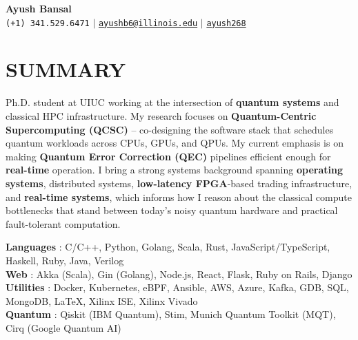 \documentclass[letterpaper,11pt]{article}
\begin{document}
\begin{center}
    \textbf{\Large Ayush Bansal} \\ \vspace{5pt}
    \small \faPhone* \hspace{2pt} \texttt{(+1) 341.529.6471} \hspace{1pt} $|$
    \hspace{1pt} \faEnvelope \hspace{2pt} \href{mailto:ayushb6@illinois.edu}{\texttt{ayushb6@illinois.edu}} \hspace{1pt} $|$
    \hspace{1pt} \faLinkedin \hspace{2pt} \href{https://linkedin.com/in/ayush268}{\texttt{ayush268}}
    \\ \vspace{-3pt}
\end{center}

\section{SUMMARY}
  \vspace{4pt}
  \small{Ph.D. student at UIUC working at the intersection of \textbf{quantum systems} and classical HPC infrastructure.
  My research focuses on \textbf{Quantum-Centric Supercomputing (QCSC)} -- co-designing the software stack that schedules
  quantum workloads across CPUs, GPUs, and QPUs. My current emphasis is on making \textbf{Quantum Error Correction (QEC)}
  pipelines efficient enough for \textbf{real-time} operation. I bring a strong systems background spanning
  \textbf{operating systems}, distributed systems, \textbf{low-latency FPGA}-based trading infrastructure, and
  \textbf{real-time systems}, which informs how I reason about the classical compute bottlenecks that stand between today's
  noisy quantum hardware and practical fault-tolerant computation.}
  \vspace{4pt}
  \begin{itemize}[leftmargin=0in, label={}]
    \small{\item{
     \textbf{Languages} {: C/C++, Python, Golang, Scala, Rust, JavaScript/TypeScript, Haskell, Ruby, Java, Verilog}\vspace{2pt} \\
     \textbf{Web}       {: Akka (Scala), Gin (Golang), Node.js, React, Flask, Ruby on Rails, Django}\vspace{2pt} \\
     \textbf{Utilities} {: Docker, Kubernetes, eBPF, Ansible, AWS, Azure, Kafka, GDB, SQL, MongoDB, \LaTeX, Xilinx ISE, Xilinx Vivado}\vspace{2pt} \\
     \textbf{Quantum}   {: Qiskit (IBM Quantum), Stim, Munich Quantum Toolkit (MQT), Cirq (Google Quantum AI)}
    }}
  \end{itemize}
\end{document}

